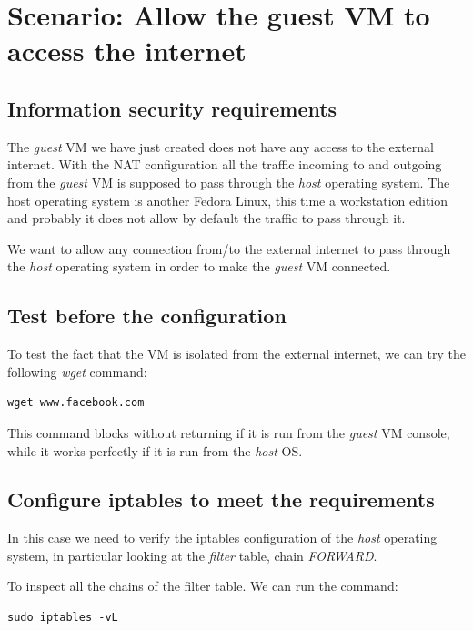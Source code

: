 \documentclass{article}
\begin{document}
\section{Scenario: Allow the guest VM to access the internet}

\subsection{Information security requirements}

The \emph{guest} VM we have just created does not have any access to the external internet.
With the NAT configuration all the traffic incoming to and outgoing from
the \emph{guest} VM
is supposed to pass through the \emph{host} operating system.
The host operating system is another Fedora Linux, this time a workstation edition
and probably it does not allow by default the traffic to pass through it.

We want to allow any connection from/to the external internet
to pass through the \emph{host} operating system
in order to make the \emph{guest} VM connected.

\subsection{Test before the configuration}

To test the fact that the VM is isolated from the external internet,
we can try the following \emph{wget} command:

\begin{verbatim}
wget www.facebook.com 
\end{verbatim}

This command blocks without returning  if it is run from the \emph{guest} VM
console, while it works perfectly if it is run from the \emph{host} OS.

\subsection{Configure iptables to meet the requirements}

In this case we need to verify the iptables configuration of the
\emph{host} operating system, in particular looking at the \emph{filter} table,
chain \emph{FORWARD}.

To inspect all the chains of the filter table.
We can run the command:

\begin{verbatim}
sudo iptables -vL
\end{verbatim}
\end{document}
